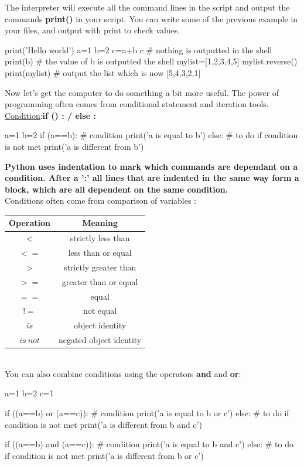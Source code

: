 \documentclass[article,10pt]{scrartcl}
\begin{document}
The interpreter will execute all the command lines in the script and output the commands \textbf{print()} in your script. You can write some of the previous example in your files, and output with print to check values.

\begin{python}
print('Hello world')
a=1
b=2
c=a+b
c # nothing is outputted in the shell
print(b) # the value of b is outputted the shell
mylist=[1,2,3,4,5]
mylist.reverse()
print(mylist) # output the list which is now [5,4,3,2,1]
\end{python}


Now let's get the computer to do something a bit more useful. The power of programming often comes from conditional statement and iteration tools.\\
\underline{Condition}:\textbf{if () :  / else :}
\begin{python}
a=1
b=2
if (a==b): # condition
   print('a is equal to b')
else: # to do if condition is not met
   print('a is different from b')
\end{python}

\textbf{Python uses indentation to mark which commands are dependant on a condition. After a ':' all lines that are indented in the same way form a block, which are all dependent on the same condition.}\\ %


Conditions often come from comparison of variables :\\
\begin{tabular}{|c|c|}
\hline
Operation & Meaning\\
\hline
$<$ & strictly less than \\
\hline
$<=$ & less than or equal \\
\hline
$>$ & strictly greater than \\
\hline
$>=$ & greater than or equal \\
\hline
$==$ & equal \\
\hline
$!=$ & not equal \\
\hline
$is$ & object identity \\
\hline
$is\ not$ & negated object identity \\
\hline
\end{tabular}
\\
You can also combine conditions using the operators \textbf{and} and \textbf{or}:
\begin{python}
a=1
b=2
c=1

if ((a==b) or (a==c)): # condition
   print('a is equal to b or c')
else: # to do if condition is not met
   print('a is different from b and c')

if ((a==b) and (a==c)): # condition
   print('a is equal to b and c')
else: # to do if condition is not met
   print('a is different from b or c')
\end{python}
\end{document}
